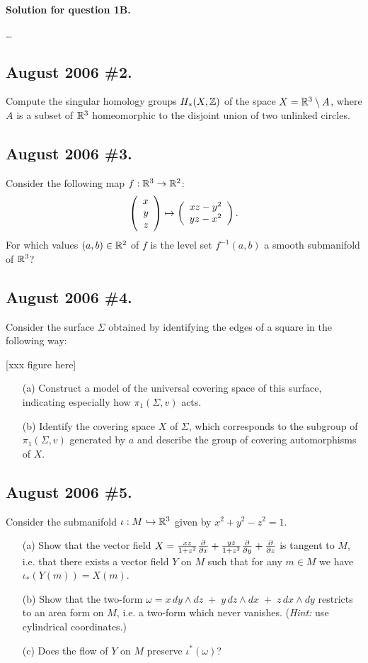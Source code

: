 \documentclass[10pt]{article}
\numberwithin{equation}{subsection}
\begin{document}
\textbf{Solution for question 1B.}

\ldots

\subsection{August 2006 \#2.}
Compute the singular homology groups $H_*(X, \mathbb{Z})$ of the space
$X=\mathbb{R}^3\setminus A$, where $A$ is a subset of $\mathbb{R}^3$ homeomorphic to the
disjoint union of two unlinked circles.

\subsection{August 2006 \#3.}
Consider the following map $f:\mathbb{R}^3 \to \mathbb{R}^2$:
$$
	\left(\begin{array}{r} x \\ y \\ z\end{array}\right) \mapsto \left(\begin{array}{r} xz-y^2 \\ yz-x^2 \end{array}\right).
$$
For which values $(a,b) \in \mathbb{R}^2$ of $f$ is the level set $f^{-1}(a, b)$
a smooth submanifold of $\mathbb{R}^3$?

\subsection{August 2006 \#4.}
Consider the surface $\Sigma$ obtained by identifying the edges
of a square in the following way:

[xxx figure here]

\begin{enumerate}
\item[(a)] Construct a model of the universal covering space of this surface,
indicating especially how $\pi_1(\Sigma, v)$ acts.
\item[(b)] Identify the covering space $X$ of $\Sigma$, which corresponds to
the subgroup of $\pi_1(\Sigma, v)$ generated by $a$ and describe the group
of covering automorphisms of $X$.
\end{enumerate}

\subsection{August 2006 \#5.}
\label{sec:A06.5}

Consider the submanifold $\iota:M \hookrightarrow \mathbb{R}^3$ given by $x^2+y^2-z^2=1$.

\begin{enumerate}
\item[(a)] Show that the vector field $X= \frac{xz}{1+z^2} \frac{\partial}{\partial x} +
\frac{yz}{1+z^2} \frac{\partial}{\partial y} + \frac{\partial}{\partial z}$ is tangent to $M$, i.e. that
there exists a vector field $Y$ on $M$ such that for any $m \in M$ we have
$\iota_*(Y(m)) = X(m)$.
\item[(b)] Show that the two-form
$\omega= x\,dy\wedge dz \;+\; y\,dz\wedge dx \;+\; z\,dx\wedge dy$
restricts to an area form on $M$, i.e. a two-form which never vanishes.
(\emph{Hint:}  use cylindrical coordinates.)
\item[(c)] Does the flow of $Y$ on $M$ preserve $\iota^*(\omega)$?
\end{enumerate}
\end{document}
